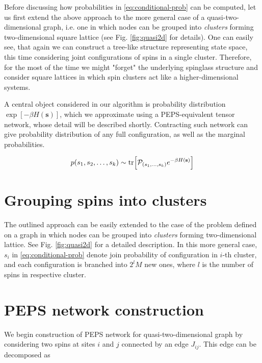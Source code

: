Before discussing how probabilities in \eqref{eq:conditional-prob} can be computed, let us first extend the above approach to the more general case of a quasi-two-dimensional graph, i.e. one in which nodes can be grouped into \emph{clusters} forming two-dimensional square lattice (see Fig. \ref{fig:quasi2d} for details). One can easily see, that again we can construct a tree-like structure representing state space, this time considering joint configurations of spins in a single cluster. Therefore, for the most of the time we might "forget" the underlying spinglass structure and consider square lattices in which spin clusters act like a higher-dimensional systems.

A central object considered in our algorithm is probability distribution $\exp[-\beta H(\mathbf{s})]$, which we approximate using a PEPS-equivalent tensor network, whose detail will be described shortly. Contracting such network can give probability distribution of any full configuration, as well as the marginal probabilities.

\begin{equation}
    p(s_1, s_2, \ldots, s_k) \sim \tr[\mathcal{P}_{(s_1, \ldots, s_k)} e^{-\beta H(\mathbf{s})}]
\end{equation}

\section{Grouping spins into clusters}
The outlined approach can be easily extended to the case of the problem defined on a graph in which nodes can be grouped into \emph{clusters} forming two-dimensional lattice. See Fig. \ref{fig:quasi2d} for a detailed description. In this more general case, $s_i$ in \eqref{eq:conditional-prob} denote join probability of configuration in $i$-th cluster, and each configuration is branched into $2^lM$ new ones, where $l$ is the number of spins in respective cluster.

\section{PEPS network construction}
We begin construction of PEPS network for quasi-two-dimensional graph by considering two spins at sites $i$ and $j$ connected by an edge $J_{ij}$. This edge can be decomposed as

